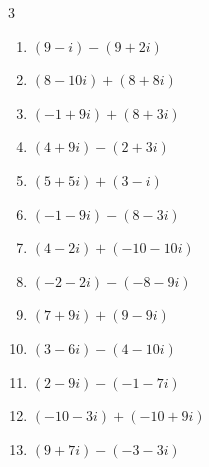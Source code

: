 \begin{multicols}{3}
\begin{enumerate}
        \phantom{$\displaystyle =3+6i$}

  \item $\displaystyle (9-i) - (9+2i)$

        \phantom{$\displaystyle =-3i$}

  \item $\displaystyle (8-10i) + (8+8i)$

        \phantom{$\displaystyle =16-2i$}

  \item $\displaystyle (-1+9i) + (8+3i)$

        \phantom{$\displaystyle =7+12i$}

  \item $\displaystyle (4+9i) - (2+3i)$

        \phantom{$\displaystyle =2+6i$}

  \item $\displaystyle (5+5i) + (3-i)$

        \phantom{$\displaystyle =8+4i$}

  \item $\displaystyle (-1-9i) - (8-3i)$

        \phantom{$\displaystyle =-9-6i$}

  \item $\displaystyle (4-2i) + (-10-10i)$

        \phantom{$\displaystyle =-6-12i$}

\columnbreak %

  \item $\displaystyle (-2-2i) - (-8-9i)$

        \phantom{$\displaystyle =6+7i$}

  \item $\displaystyle (7+9i) + (9-9i)$

        \phantom{$\displaystyle =16$}

  \item $\displaystyle (3-6i) - (4-10i)$

        \phantom{$\displaystyle =-1+4i$}

  \item $\displaystyle (2-9i) - (-1-7i)$

        \phantom{$\displaystyle =3-2i$}

  \item $\displaystyle (-10-3i) + (-10+9i)$

        \phantom{$\displaystyle =-20+6i$}

  \item $\displaystyle (9+7i) - (-3-3i)$


\end{enumerate}
\end{multicols}
